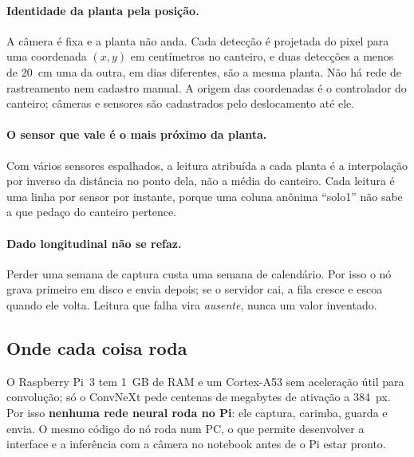 \documentclass[11pt,a4paper]{article}
\begin{document}
\paragraph{Identidade da planta pela posição.}
A câmera é fixa e a planta não anda. Cada detecção é projetada do pixel para uma
coordenada $(x, y)$ em centímetros no canteiro, e duas detecções a menos de 20~cm
uma da outra, em dias diferentes, são a mesma planta. Não há rede de rastreamento
nem cadastro manual. A origem das coordenadas é o controlador do canteiro; câmeras e
sensores são cadastrados pelo deslocamento até ele.

\paragraph{O sensor que vale é o mais próximo da planta.}
Com vários sensores espalhados, a leitura atribuída a cada planta é a interpolação
por inverso da distância no ponto dela, não a média do canteiro. Cada leitura é uma
linha por sensor por instante, porque uma coluna anônima ``solo1'' não sabe a que
pedaço do canteiro pertence.

\paragraph{Dado longitudinal não se refaz.}
Perder uma semana de captura custa uma semana de calendário. Por isso o nó grava
primeiro em disco e envia depois; se o servidor cai, a fila cresce e escoa quando ele
volta. Leitura que falha vira \emph{ausente}, nunca um valor inventado.

\subsection{Onde cada coisa roda}
O Raspberry Pi~3 tem 1~GB de RAM e um Cortex-A53 sem aceleração útil para
convolução; só o ConvNeXt pede centenas de megabytes de ativação a 384~px. Por isso
\textbf{nenhuma rede neural roda no Pi}: ele captura, carimba, guarda e envia. O
mesmo código do nó roda num PC, o que permite desenvolver a interface e a inferência
com a câmera no notebook antes de o Pi estar pronto.
\end{document}
